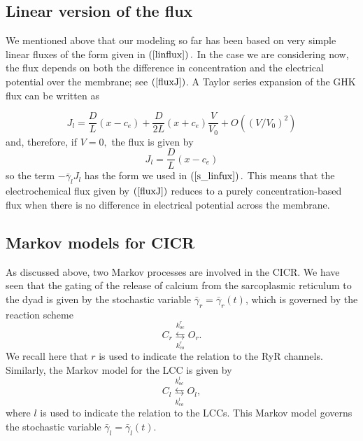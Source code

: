 \bigskip

\subsection{Linear version of the flux}

We mentioned above that our modeling so far has been based on very simple
linear fluxes of the form given in $\left(  \ref{linflux}\right)  .$ In the
case we are considering now, the flux depends on both the difference in
concentration and the electrical potential over the membrane; see $\left(
\ref{fluxJ}\right)$.  A Taylor series expansion of the GHK flux can be written as%

\begin{equation}
J_{l}=\allowbreak\frac{D}{L}\left(  x-c_{e}\right)  +\frac{D}{2L}\left(
x+c_{e}\right)  \frac{V}{V_0} +O\left( \left( V\slash V_0\right)^{2}\right) \label{l_flux}%
\end{equation}
and, therefore, if $V=0,$ the flux is given by 
\[ 
J_{l}=\frac{D}{L}\left(
x-c_{e}\right)
\]
so the term $-\bar{\gamma}_{l}J_{l} $ has the form we used
in $\left(  \ref{s_linfux}\right) .$ This means that the electrochemical flux given by $\left(
\ref{fluxJ}\right)$ reduces to a purely concentration-based flux 
 when there is no difference in electrical potential across the membrane.


\subsection{Markov models for CICR}

As discussed above, two Markov processes are involved in the CICR. We have seen that the gating of the release of
calcium from the sarcoplasmic reticulum to the dyad is given by the stochastic variable
$\bar{\gamma}_{r}=\bar{\gamma}_{r}(t)$, which is governed by the reaction
scheme%
\begin{equation}
C_{r}\underset{k_{co}^{r}}{\overset{k_{oc}^{r}}{\leftrightarrows}}O_{r}.
\label{m_r}%
\end{equation}
We recall here that $r$ is used to indicate the relation to the RyR
channels. Similarly, the Markov model for the LCC is given by%
\begin{equation}
C_{l}\underset{k_{co}^{l}}{\overset{k_{oc}^{l}}{\leftrightarrows}}O_{l},
\label{m_l}%
\end{equation}
where $l$ is used to indicate the relation to the LCCs.
This Markov model governs the stochastic variable $\bar{\gamma}_{l}%
=\bar{\gamma}_{l}(t).$

